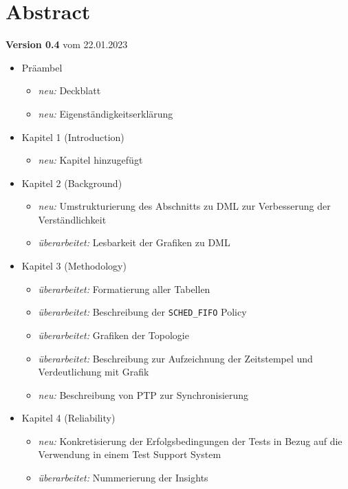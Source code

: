 \cleardoublepage

\chapter*{Abstract}
    
    \large
    \textbf{Version 0.4}
    \normalsize
    vom 22.01.2023 \\
   
   	\begin{itemize}
   		\item Präambel
		\begin{itemize}
  			\item \textit{neu:} Deckblatt
  			\item \textit{neu:} Eigenständigkeitserklärung
		\end{itemize}

		\item Kapitel 1 (Introduction)
		\begin{itemize}
  			\item \textit{neu:} Kapitel hinzugefügt
		\end{itemize}
		
		\item Kapitel 2 (Background)
		\begin{itemize}
  			\item \textit{neu:} Umstrukturierung des Abschnitts zu DML zur Verbesserung der Verständlichkeit
  			\item \textit{überarbeitet:} Lesbarkeit der Grafiken zu DML
		\end{itemize}

		\item Kapitel 3 (Methodology)
		\begin{itemize}
  			\item \textit{überarbeitet:} Formatierung aller Tabellen
  			\item \textit{überarbeitet:} Beschreibung der \texttt{SCHED\_FIFO} Policy
  			\item \textit{überarbeitet:} Grafiken der Topologie
  			\item \textit{überarbeitet:} Beschreibung zur Aufzeichnung der Zeitstempel und Verdeutlichung mit Grafik
  			\item \textit{neu:} Beschreibung von PTP zur Synchronisierung
		\end{itemize}
		
		\item Kapitel 4 (Reliability)
		\begin{itemize}
  			\item \textit{neu:} Konkretisierung der Erfolgsbedingungen der Tests in Bezug auf die Verwendung in einem Test Support System
  			\item \textit{überarbeitet:} Nummerierung der Insights
		\end{itemize}
		

\end{itemize}
